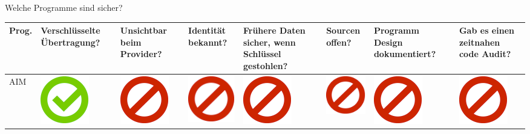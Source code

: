 \documentclass[final]{beamer}
\newlength{\twocolwid}
\begin{document}
\begin{frame}[t]
\begin{columns}[t, totalwidth=\textwidth]
\begin{column}{\twocolwid}
\begin{block}{Welche Programme sind sicher?}
\begin{tabular}{ l | C{4cm} | C{4.5cm} | C{4cm} | C{4.5cm} | C{4cm} | C{5cm} | C{3cm} | }
Prog. & Ver\-schlüs\-sel\-te Übertragung? & Unsichtbar beim Provider? & Identität bekannt? & Frühere Daten sicher, wenn Schlüssel gestohlen? & Sourcen offen? & Programm Design dokumentiert? & Gab es einen zeitnahen code Audit? \tabularnewline
\hline
AIM & \includegraphics[scale=0.5]{pics/haken.png} & \includegraphics[scale=0.5]{pics/nohaken.png} & \includegraphics[scale=0.5]{pics/nohaken.png} & \includegraphics[scale=0.5]{pics/nohaken.png} & \includegraphics[scale=0.5]{pics/nohaken.png} & \includegraphics[scale=0.5]{pics/nohaken.png} & \includegraphics[scale=0.5]{pics/nohaken.png} \tabularnewline[0.5ex]

\end{tabular}
\end{block}
\end{column}
\end{columns}
\end{frame}
\end{document}
